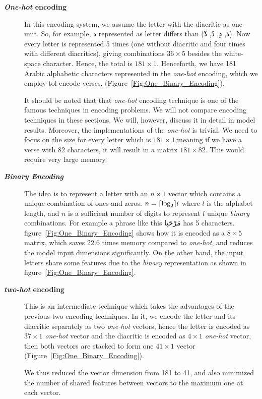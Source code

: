 \begin{description}

 \item[\textbf{\textit{One-hot} encoding}] In this encoding system, we assume the letter with the diacritic as one unit. So, for example, \textarabic{د} represented as letter differs than (\textarabic{دَ, دِ, دُ, دْْ}). Now every letter is represented 5 times (one without diacritic and four times with different diacritics), giving combinations $36 \times 5$ besides the white-space character. Hence, the total is $181 \times 1$. Henceforth, we have 181 Arabic alphabetic characters represented in the \textit{one-hot} encoding, which we employ tol encode verses. (Figure~\ref{Fig:One_Binary_Encoding}).

 It should be noted that that \textit{one-hot} encoding technique is one of the famous techniques in
 encoding problems. We will not compare encoding techniques in these sections. We will, 
 however, discuss it in detail in model results. Moreover, the implementations of the \textit{one-hot} is
 trivial. We need to focus on the size for every letter which is $181 \times 1$;meaning if we have
 a verse with 82 characters, it will result in a matrix $181 \times 82$. This would require very 
 large memory.

 \item[\textbf{\textit{Binary Encoding}}] The idea is to represent a letter with an $n \times 1$ vector which contains a unique combination of ones and zeros. $n =\ceil*{\log_2} l$ where $l$ is the alphabet length, and $n$ is a sufficient number of digits to represent $l$ unique \textit{binary} combinations. For example a phrase like this \textarabic{مَرْحَبا} has 5 characters. figure~\ref{Fig:One_Binary_Encoding} shows how it is encoded as a $8 \times 5$ matrix, which saves 22.6 times memory compared to \textit{one-hot}, and reduces the model input dimensions significantly. On the other hand, the input letters share some features due to the \textit{binary} representation as shown in figure~\ref{Fig:One_Binary_Encoding}.

 \item[\textbf{\textit{two-hot} encoding}] This is an intermediate technique which takes the advantages of the previous two encoding techniques. In it, we encode the letter and its diacritic separately as two \textit{one-hot} vectors, hence the letter is encoded as $37 \times 1$ \textit{one-hot} vector and the diacritic is encoded as $4 \times 1$ \textit{one-hot} vector, then both vectors are stacked to form one $41 \times 1$ vector (Figure~\ref{Fig:One_Binary_Encoding}).

 We thus reduced the vector dimension from 181 to 41, and also minimized the number of shared features between vectors to the maximum one at each vector. 

\end{description}

